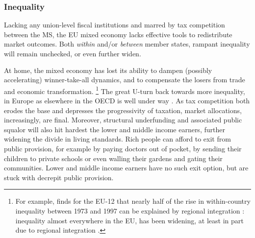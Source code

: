\subsubsection{Inequality}
Lacking any union-level fiscal institutions and marred by tax competition between the \gls{MS}, the \gls{EU} mixed economy lacks effective tools to redistribute market outcomes.
Both \emph{within} and/or \emph{between} member states, rampant inequality will remain unchecked, or even further widen.

At home, the mixed economy has lost its ability to dampen (possibly accelerating) winner-take-all dynamics, and to compensate the losers from trade and economic transformation.
\footnote{
	For example, \citeauthor{Beckfield2006} finds for the \gls{EU}-12 that nearly half of the rise in within-country inequality between 1973 and 1997 can be explained by regional integration \citeyearpar[979]{Beckfield2006}:
	inequality almost everywhere in the \gls{EU}, has been widening, at least in part due to regional integration \citep[for example,][265]{DaudUngl200}.
}
The great U-turn back towards more inequality, in Europe as elsewhere in the \gls{OECD} is well under way \citep{AldersonNielsen-2002-aa}.
As tax competition both erodes the base and depresses the progressivity of taxation, market allocations, increasingly, are final.
Moreover, structural underfunding and associated public squalor will also hit hardest the lower and middle income earners, further widening the divide in living standards.
Rich people can afford to exit from public provision, for example by paying doctors out of pocket, by sending their children to private schools or even walling their gardens and gating their communities.
Lower and middle income earners have no such exit option, but are stuck with decrepit public provision.

